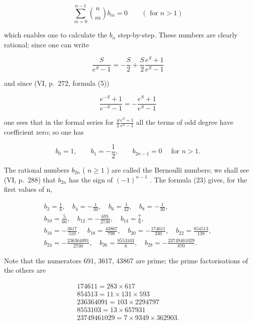 \[
\sum_ {m = 0} ^ {n - 1} \binom {n} {m} b _ {m} = 0 \qquad (\text { for } n > 1)\tag{23}
\]

which enables one to calculate the \(b_{n}\) step-by-step. These numbers are clearly rational; since one can write

\[
{\frac {S}{e ^ {S} - 1}} = - {\frac {S}{2}} + {\frac {S}{2}} {\frac {e ^ {S} + 1}{e ^ {S} - 1}}
\]

and since (VI, p.~272, formula (5))

\[
\frac {e ^ {- S} + 1}{e ^ {- S} - 1} = - \frac {e ^ {S} + 1}{e ^ {S} - 1}
\]

one sees that in the formal series for \(\frac{S}{2}\frac{e^{S}+1}{e^{S}-1}\) all the terms of odd degree have coefficient zero; so one has

\[
b _ {0} = 1, \qquad b _ {1} = - \frac {1}{2}, \qquad b _ {2 n - 1} = 0 \quad \text { for } n > 1.\tag{24}
\]

The rational numbers \(b_{2n}\) ( \(n \geqslant 1\) ) are called the Bernoulli numbers; we shall see (VI, p.~288) that \(b_{2n}\) has the sign of \((-1)^{n-1}\) . The formula (23) gives, for the first values of n,

\[
\begin{array}{c} b _ {2} = \frac {1}{6}, \quad b _ {4} = - \frac {1}{3 0}, \quad b _ {6} = \frac {1}{4 2}, \quad b _ {8} = - \frac {1}{3 0}, \\ b _ {1 0} = \frac {5}{6 6}, \quad b _ {1 2} = - \frac {6 9 1}{2 7 3 0}, \quad b _ {1 4} = \frac {7}{6}, \\ b _ {1 6} = - \frac {3 6 1 7}{5 1 0}, \quad b _ {1 8} = \frac {4 3 8 6 7}{7 9 8}, \quad b _ {2 0} = - \frac {1 7 4 6 1 1}{3 3 0}, \quad b _ {2 2} = \frac {8 5 4 5 1 3}{1 3 8}, \\ b _ {2 4} = - \frac {2 3 6 3 6 4 0 9 1}{2 7 3 0}, \quad b _ {2 6} = \frac {8 5 5 3 1 0 3}{6}, \quad b _ {2 8} = - \frac {2 3 7 4 9 4 6 1 0 2 9}{8 7 0}. \end{array}
\]

Note that the numerators 691, 3617, 43867 are prime; the prime factorisations of the others are

\[
\begin{array}{c} 1 7 4 6 1 1 = 2 8 3 \times 6 1 7 \\ 8 5 4 5 1 3 = 1 1 \times 1 3 1 \times 5 9 3 \\ 2 3 6 3 6 4 0 9 1 = 1 0 3 \times 2 2 9 4 7 9 7 \\ 8 5 5 3 1 0 3 = 1 3 \times 6 5 7 9 3 1 \\ 2 3 7 4 9 4 6 1 0 2 9 = 7 \times 9 3 4 9 \times 3 6 2 9 0 3. \end{array}
\]

